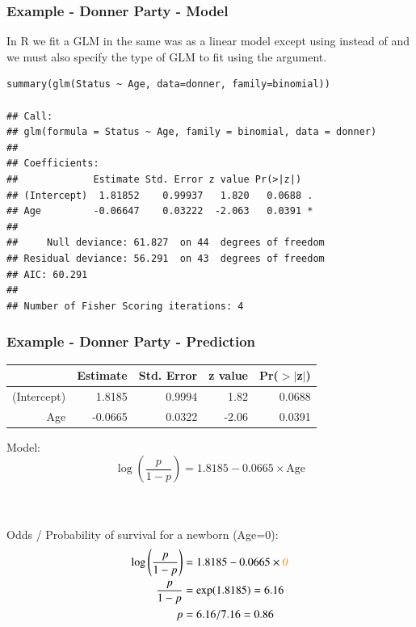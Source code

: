 \begin{frame}[fragile]
\frametitle{Example - Donner Party - Model}
\vspace{-2mm}
In R we fit a GLM in the same was as a linear model except using  instead of  and we must also specify the type of GLM to fit using the  argument.\\

\vspace{2mm}

{\footnotesize
\begin{verbatim}
summary(glm(Status ~ Age, data=donner, family=binomial))

## Call:
## glm(formula = Status ~ Age, family = binomial, data = donner) 
## 
## Coefficients:
##             Estimate Std. Error z value Pr(>|z|)  
## (Intercept)  1.81852    0.99937   1.820   0.0688 .
## Age         -0.06647    0.03222  -2.063   0.0391 *
## 
##     Null deviance: 61.827  on 44  degrees of freedom
## Residual deviance: 56.291  on 43  degrees of freedom
## AIC: 60.291
## 
## Number of Fisher Scoring iterations: 4
\end{verbatim}
}
\end{frame}



\begin{frame}
\frametitle{Example - Donner Party - Prediction}

{\scriptsize
\begin{center}
\begin{tabular}{rrrrr}
  \hline
 & Estimate & Std. Error & z value & Pr($>$$|$z$|$) \\ 
  \hline
(Intercept) & 1.8185 & 0.9994 & 1.82 & 0.0688 \\ 
  Age & -0.0665 & 0.0322 & -2.06 & 0.0391 \\ 
   \hline
\end{tabular}
\end{center}
}

Model:
\[\log\left(\frac{p}{1-p}\right) = 1.8185-0.0665\times \text{Age}\]

\pause
~\\~\\
Odds / Probability of survival for a newborn (Age=0):
\pause
{\scriptsize
\begin{align*}
\log\left(\frac{p}{1-p}\right) &= 1.8185-0.0665\times \textit{\textcolor{orange}{0}}\\
\frac{p}{1-p} &= \exp(1.8185) = 6.16 \\
p &= 6.16/7.16 = 0.86 
\end{align*}
}

\end{frame}

